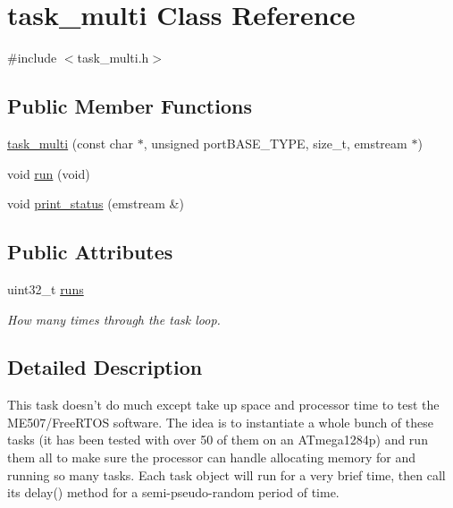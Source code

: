 \hypertarget{classtask__multi}{\section{task\-\_\-multi \-Class \-Reference}
\label{classtask__multi}
}


{\ttfamily \#include $<$task\-\_\-multi.\-h$>$}

\subsection*{\-Public \-Member \-Functions}
\begin{DoxyCompactItemize}
\item 
\hyperlink{classtask__multi_a218e8d171e30c27fbcb42da6917b5183}{task\-\_\-multi} (const char $\ast$, unsigned port\-B\-A\-S\-E\-\_\-\-T\-Y\-P\-E, size\-\_\-t, emstream $\ast$)
\item 
void \hyperlink{classtask__multi_a66f62aa64889850eca87e1504c604fc8}{run} (void)
\item 
void \hyperlink{classtask__multi_a1151df7d6a9db246951be2f12e1f9698}{print\-\_\-status} (emstream \&)
\end{DoxyCompactItemize}
\subsection*{\-Public \-Attributes}
\begin{DoxyCompactItemize}
\item 
\hypertarget{classtask__multi_a6baa00e27d51096a455f2f4c7b5f4006}{uint32\-\_\-t \hyperlink{classtask__multi_a6baa00e27d51096a455f2f4c7b5f4006}{runs}}\label{classtask__multi_a6baa00e27d51096a455f2f4c7b5f4006}

\begin{DoxyCompactList}\small\item\em \-How many times through the task loop. \end{DoxyCompactList}\end{DoxyCompactItemize}


\subsection{\-Detailed \-Description}
\-This task doesn't do much except take up space and processor time to test the \-M\-E507/\-Free\-R\-T\-O\-S software. \-The idea is to instantiate a whole bunch of these tasks (it has been tested with over 50 of them on an \-A\-Tmega1284p) and run them all to make sure the processor can handle allocating memory for and running so many tasks. \-Each task object will run for a very brief time, then call its delay() method for a semi-\/pseudo-\/random period of time. 


